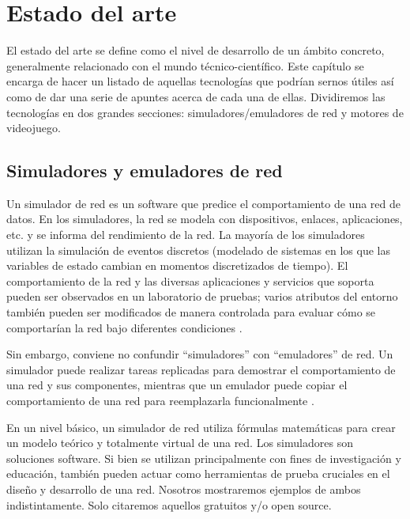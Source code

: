 \chapter{Estado del arte}\label{chap:ArtState}

El estado del arte se define como el nivel de desarrollo de un ámbito concreto, generalmente relacionado con el mundo técnico-científico. Este capítulo se encarga de hacer un listado de aquellas tecnologías que podrían sernos útiles así como de dar una serie de apuntes acerca de cada una de ellas. Dividiremos las tecnologías en dos grandes secciones: simuladores/emuladores de red y motores de videojuego.

\section{Simuladores y emuladores de red}
Un simulador de red es un software que predice el comportamiento de una red de datos. En los simuladores, la red se modela con dispositivos, enlaces, aplicaciones, etc. y se informa del rendimiento de la red. La mayoría de los simuladores utilizan la simulación de eventos discretos (modelado de sistemas en los que las variables de estado cambian en momentos discretizados de tiempo). El comportamiento de la red y las diversas aplicaciones y servicios que soporta pueden ser observados en un laboratorio de pruebas; varios atributos del entorno también pueden ser modificados de manera controlada para evaluar cómo se comportarían la red bajo diferentes condiciones \cite{wiki:Network_simulation}.

Sin embargo, conviene no confundir ``simuladores'' con ``emuladores'' de red. Un simulador puede realizar tareas replicadas para demostrar el comportamiento de una red y sus componentes, mientras que un emulador puede copiar el comportamiento de una red para reemplazarla funcionalmente \cite{emsim}.

En un nivel básico, un simulador de red utiliza fórmulas matemáticas para crear un modelo teórico y totalmente virtual de una red. Los simuladores son soluciones software. Si bien se utilizan principalmente con fines de investigación y educación, también pueden actuar como herramientas de prueba cruciales en el diseño y desarrollo de una red. Nosotros mostraremos ejemplos de ambos indistintamente. Solo citaremos aquellos gratuitos y/o open source.

